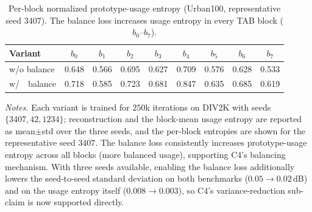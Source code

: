 \begin{table}[H]
\centering
\caption{Per-block normalized prototype-usage entropy (Urban100, representative seed $3407$).
The balance loss increases usage entropy in every TAB block ($b_0$--$b_7$).}
\label{tab:abl_a3_perblock}
\begingroup
\scriptsize
\setlength{\tabcolsep}{2.6pt}
\renewcommand{\arraystretch}{1.05}
\begin{tabular*}{\columnwidth}{@{\extracolsep{\fill}}lcccccccc}
\toprule
Variant & $b_0$ & $b_1$ & $b_2$ & $b_3$ & $b_4$ & $b_5$ & $b_6$ & $b_7$ \\
\midrule
w/o balance & 0.648 & 0.566 & 0.695 & 0.627 & 0.709 & 0.576 & 0.628 & 0.533 \\
w/\ \ balance & 0.718 & 0.585 & 0.723 & 0.681 & 0.847 & 0.635 & 0.685 & 0.619 \\
\bottomrule
\end{tabular*}
\endgroup

\vspace{2pt}
{\footnotesize
\textit{Notes.} Each variant is trained for $250$k iterations on DIV2K with seeds
$\{3407,42,1234\}$; reconstruction and the block-mean usage entropy are reported as mean$\pm$std
over the three seeds, and the per-block entropies are shown for the representative seed $3407$.
The balance loss consistently increases prototype-usage entropy across all blocks (more balanced
usage), supporting C4's balancing mechanism. With three seeds available, enabling the balance
loss additionally lowers the seed-to-seed standard deviation on both benchmarks
($0.05\!\rightarrow\!0.02$\,dB) and on the usage entropy itself
($0.008\!\rightarrow\!0.003$), so C4's variance-reduction sub-claim is now supported directly.}
\end{table}
